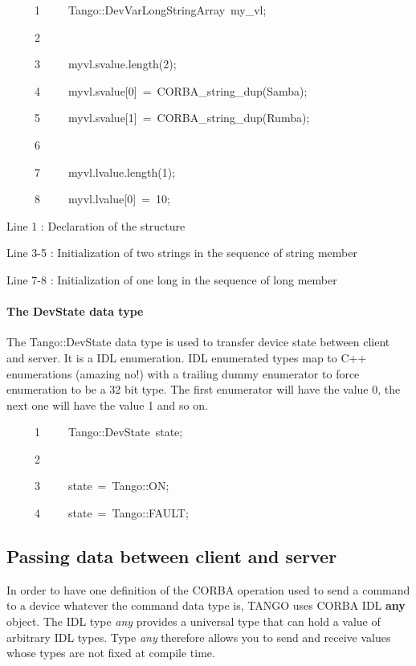 
\begin{lyxcode}
~~~~~1~~~~~Tango::DevVarLongStringArray~my\_vl;

~~~~~2~~

~~~~~3~~~~~myvl.svalue.length(2);

~~~~~4~~~~~myvl.svalue{[}0{]}~=~CORBA\_string\_dup(\textquotedbl{}Samba\textquotedbl{});

~~~~~5~~~~~myvl.svalue{[}1{]}~=~CORBA\_string\_dup(\textquotedbl{}Rumba\textquotedbl{});

~~~~~6~~

~~~~~7~~~~~myvl.lvalue.length(1);

~~~~~8~~~~~myvl.lvalue{[}0{]}~=~10;
\end{lyxcode}


Line 1 : Declaration of the structure

Line 3-5 : Initialization of two strings in the sequence of string
member

Line 7-8 : Initialization of one long in the sequence of long member


\paragraph{The DevState data type}

The Tango::DevState data type is used to transfer
device state between client and server. It is a IDL enumeration. IDL
enumerated types map to C++ enumerations (amazing no!) with a trailing
dummy enumerator to force enumeration to be a 32 bit type. The first
enumerator will have the value 0, the next one will have the value
1 and so on.


\begin{lyxcode}
~~~~~1~~~~~Tango::DevState~state;

~~~~~2~~

~~~~~3~~~~~state~=~Tango::ON;

~~~~~4~~~~~state~=~Tango::FAULT;
\end{lyxcode}



\subsection{Passing data between client and server}

In order to have one definition of the CORBA operation used to send
a command to a device whatever the command data type is, TANGO uses
CORBA IDL \textbf{any} object. The IDL type \emph{any}
provides a universal type that can hold a value of arbitrary IDL types.
Type \emph{any} therefore allows you to send and receive values whose
types are not fixed at compile time.

